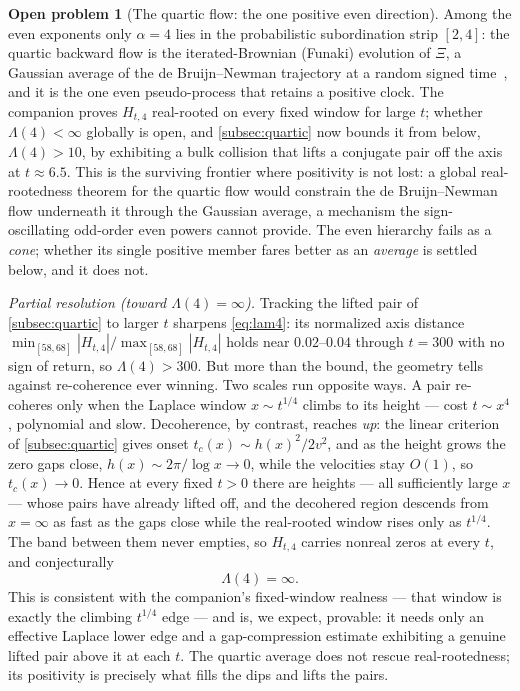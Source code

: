 \documentclass[11pt,reqno]{amsart}
\theoremstyle{plain}
\theoremstyle{definition}
\newtheorem{problem}[theorem]{Open problem}
\theoremstyle{remark}
\begin{document}
\begin{problem}[The quartic flow: the one positive even direction]
\label{prob:quartic}
Among the even exponents only $\alpha=4$ lies in the probabilistic
subordination strip $[2,4]$: the quartic backward flow is the
iterated-Brownian (Funaki) evolution of $\Xi$, a Gaussian average of the de
Bruijn--Newman trajectory at a random signed time~\cite{Fsymbol,Funaki},
and it is the one even pseudo-process that retains a positive clock. The
companion proves $H_{t,4}$ real-rooted on every fixed window for large $t$;
whether $\Lambda(4)<\infty$ globally is open, and \cref{subsec:quartic} now
bounds it from below, $\Lambda(4)>10$, by exhibiting a bulk collision that
lifts a conjugate pair off the axis at $t\approx6.5$. This is the surviving
frontier where positivity is not lost: a global real-rootedness theorem for
the quartic flow would constrain the de Bruijn--Newman flow underneath it
through the Gaussian average, a mechanism the sign-oscillating odd-order
even powers cannot provide. The even hierarchy fails as a \emph{cone};
whether its single positive member fares better as an \emph{average} is
settled below, and it does not.

\smallskip\noindent\emph{Partial resolution (toward $\Lambda(4)=\infty$).}
Tracking the lifted pair of \cref{subsec:quartic} to larger $t$ sharpens
\eqref{eq:lam4}: its normalized axis distance
$\min_{[58,68]}|H_{t,4}|/\max_{[58,68]}|H_{t,4}|$ holds near $0.02$--$0.04$
through $t=300$ with no sign of return, so $\Lambda(4)>300$. But more than the
bound, the geometry tells against re-coherence ever winning. Two scales run
opposite ways. A pair re-coheres only when the Laplace window $x\sim t^{1/4}$
climbs to its height --- cost $t\sim x^4$, polynomial and slow. Decoherence,
by contrast, reaches \emph{up}: the linear criterion of \cref{subsec:quartic}
gives onset $t_c(x)\sim h(x)^2/2v^2$, and as the height grows the zero gaps
close, $h(x)\sim2\pi/\log x\to0$, while the velocities stay $O(1)$, so
$t_c(x)\to0$. Hence at every fixed $t>0$ there are heights --- all
sufficiently large $x$ --- whose pairs have already lifted off, and the
decohered region descends from $x=\infty$ as fast as the gaps close while the
real-rooted window rises only as $t^{1/4}$. The band between them never
empties, so $H_{t,4}$ carries nonreal zeros at every $t$, and conjecturally
\begin{equation}\label{eq:lam4inf}
  \Lambda(4)=\infty .
\end{equation}
This is consistent with the companion's fixed-window realness --- that window
is exactly the climbing $t^{1/4}$ edge --- and is, we expect, provable: it
needs only an effective Laplace lower edge and a gap-compression estimate
exhibiting a genuine lifted pair above it at each $t$. The quartic average
does not rescue real-rootedness; its positivity is precisely what fills the
dips and lifts the pairs.
\end{problem}
\end{document}
